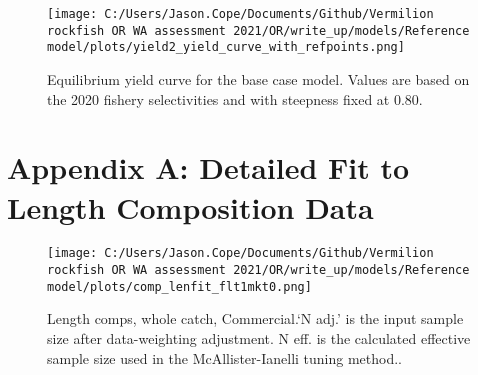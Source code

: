 \documentclass[11pt,
  english,
  a4paper,
]{article}
\begin{document}
\tagmcend\tagstructend


\begin{figure}
\centering
\texttt{[image: C:/Users/Jason.Cope/Documents/Github/Vermilion rockfish OR WA assessment 2021/OR/write\_up/models/Reference model/plots/yield2\_yield\_curve\_with\_refpoints.png]}
\caption{Equilibrium yield curve for the base case model. Values are based on the 2020 fishery selectivities and with steepness fixed at 0.80.\label{fig:yield}}
\end{figure}

\tagmcend\tagstructend

\clearpage


\hypertarget{app-a}{%
\section{Appendix A: Detailed Fit to Length Composition Data}\label{app-a}}

\leavevmode\tagmcend\tagstructend


\begin{figure}
\centering
\texttt{[image: C:/Users/Jason.Cope/Documents/Github/Vermilion rockfish OR WA assessment 2021/OR/write\_up/models/Reference model/plots/comp\_lenfit\_flt1mkt0.png]}
\caption{Length comps, whole catch, Commercial.`N adj.' is the input sample size after data-weighting adjustment. N eff. is the calculated effective sample size used in the McAllister-Ianelli tuning method..\label{fig:comp_lenfit_flt1mkt0}}
\end{figure}

\tagmcend\tagstructend

\end{document}
